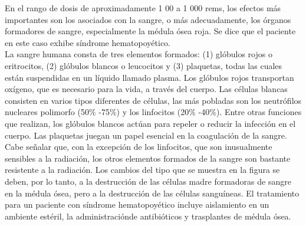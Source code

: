 \documentclass[]{article}
\begin{document}
En el rango de dosis de aproximadamente 1 00 a 1 000 rems, los efectos más importantes son los asociados con la sangre, o más adecuadamente, los órganos formadores de sangre, especialmente la médula ósea roja. Se dice que el paciente en este caso exhibe síndrome hematopoyético.\\

La sangre humana consta de tres elementos formados: (1) glóbulos rojos o eritrocitos, (2) glóbulos blancos o leucocitos y (3) plaquetas, todas las cuales están suspendidas en un líquido llamado plasma. Los glóbulos rojos transportan oxígeno, que es necesario para la vida, a través del cuerpo. Las células blancas consisten en varios tipos diferentes de células, las más pobladas son los neutrófilos nucleares polimorfo (50$\%$ -75$\%$) y los linfocitos (20$\%$ -40$\%$). Entre otras funciones que realizan, los glóbulos blancos actúan para repeler o reducir la infección en el cuerpo. Las plaquetas juegan un papel esencial en la coagulación de la sangre.\\


Cabe señalar que, con la excepción de los linfocitos, que son inusualmente sensibles a la radiación, los otros elementos formados de la sangre son bastante resistente a la radiación. Los cambios del tipo que se muestra en la figura se deben, por lo tanto, a la destrucción de las células madre formadoras de sangre en la médula ósea, pero a la destrucción de las células sanguíneas. El tratamiento para un paciente con síndrome hematopoyético incluye aislamiento en un ambiente estéril, la administraciónde antibióticos y trasplantes de médula ósea.\\
\end{document}
